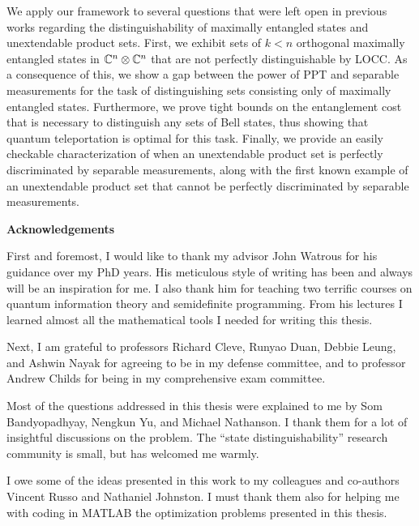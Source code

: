 We apply our framework to several questions that were left open in previous works 
regarding the distinguishability  of maximally entangled states and unextendable product sets. 
First, we exhibit sets of $k < n$ orthogonal maximally entangled states in $\mathbb{C}^{n}\otimes\mathbb{C}^{n}$ 
that are not perfectly distinguishable by LOCC.
As a consequence of this, we show a gap between the power of PPT and separable measurements 
for the task of distinguishing sets consisting only of maximally entangled states.
Furthermore, we prove tight bounds on the entanglement cost that is necessary to
distinguish any sets of Bell states, thus showing that quantum teleportation is optimal for this task.
Finally, we provide an easily checkable characterization of when an unextendable product set is 
perfectly discriminated by separable measurements, along with the first known 
example of an unextendable product set that cannot be perfectly discriminated 
by separable measurements.

\cleardoublepage
\newpage


\begin{center}\textbf{Acknowledgements}\end{center}

First and foremost, I would like to thank my advisor John Watrous for his guidance
over my PhD years.
His meticulous style of writing has been and always will be an inspiration for me.  
I also thank him for teaching two terrific courses on quantum information theory 
and semidefinite programming. From his lectures I learned almost all the mathematical tools
I needed for writing this thesis.

Next, I am grateful to professors Richard Cleve, Runyao Duan, Debbie Leung, and Ashwin Nayak 
for agreeing to be in my defense committee, and to professor Andrew Childs for being in
my comprehensive exam committee.

Most of the questions addressed in this thesis were explained to me by Som Bandyopadhyay, 
Nengkun Yu, and Michael Nathanson. I thank them for a lot of insightful discussions on the problem.
The ``state distinguishability'' research community is small, but has welcomed me warmly.

I owe some of the ideas presented in this work to my colleagues and co-authors 
Vincent Russo and Nathaniel Johnston. I must thank them also for helping me
with coding in MATLAB the optimization problems presented in this thesis.

